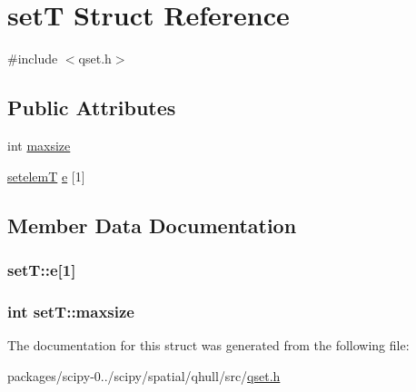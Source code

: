 \hypertarget{structsetT}{}\section{set\+T Struct Reference}
\label{structsetT}


{\ttfamily \#include $<$qset.\+h$>$}

\subsection*{Public Attributes}
\begin{DoxyCompactItemize}
\item 
int \hyperlink{structsetT_aec374c945cd0c1242d817530f7638dd8}{maxsize}
\item 
\hyperlink{unionsetelemT}{setelem\+T} \hyperlink{structsetT_a93b446d6fba53905372240820c393fb2}{e} \mbox{[}1\mbox{]}
\end{DoxyCompactItemize}


\subsection{Member Data Documentation}
\hypertarget{structsetT_a93b446d6fba53905372240820c393fb2}{}
\subsubsection[{e}]{ set\+T\+::e\mbox{[}1\mbox{]}}\label{structsetT_a93b446d6fba53905372240820c393fb2}
\hypertarget{structsetT_aec374c945cd0c1242d817530f7638dd8}{}
\subsubsection[{maxsize}]{\setlength{\rightskip}{0pt plus 5cm}int set\+T\+::maxsize}\label{structsetT_aec374c945cd0c1242d817530f7638dd8}


The documentation for this struct was generated from the following file\+:\begin{DoxyCompactItemize}
\item 
packages/scipy-\/0../scipy/spatial/qhull/src/\hyperlink{qset_8h}{qset.\+h}\end{DoxyCompactItemize}
